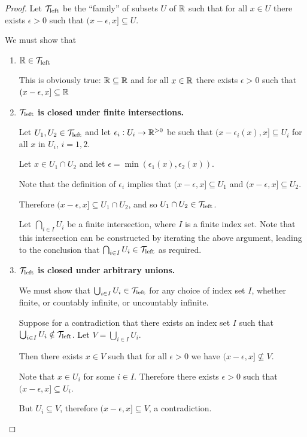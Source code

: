 \documentclass[12pt]{article}
\begin{document}
\begin{proof}
  Let $\mathcal T_\text{left}$ be the ``family'' of subsets $U$ of $\mathbb{R}$ such that for all $x \in U$ there exists
  $\epsilon > 0$ such that $(x - \epsilon, x] \subseteq U$.

  We must show that
  \begin{enumerate}
  \item {\bf $\mathbb{R} \in \mathcal T_\text{left}$}

    This is obviously true: $\mathbb{R} \subseteq \mathbb{R}$ and for all $x \in \mathbb{R}$ there exists $\epsilon > 0$
    such that $(x - \epsilon, x] \subseteq \mathbb{R}$



  \item {\bf $\mathcal T_\text{left}$ is closed under finite intersections.}

    Let $U_1, U_2 \in \mathcal T_\text{left}$ and let $\epsilon_i:U_i \to \mathbb{R}^{>0}$ be such that
    $(x - \epsilon_i(x), x] \subseteq U_i$ for all $x$ in $U_i$, $i = 1, 2$.

    Let $x \in U_1 \cap U_2$ and let $\epsilon = \min(\epsilon_1(x), \epsilon_2(x))$.

    Note that the definition of $\epsilon_i$ implies that $(x - \epsilon, x] \subseteq U_1$ and
    $(x - \epsilon, x] \subseteq U_2$.

    Therefore $(x - \epsilon, x] \subseteq U_1 \cap U_2$, and so $U_1 \cap U_2 \in \mathcal T_\text{left}$.

    Let $\bigcap_{i \in I} U_i$ be a finite intersection, where $I$ is a finite index set. Note
    that this intersection can be constructed by iterating the above argument, leading to the
    conclusion that $\bigcap_{i \in I} U_i \in \mathcal T_\text{left}$ as required.

  \item {\bf $\mathcal T_\text{left}$ is closed under arbitrary unions.}

    We must show that $\bigcup_{i \in I} U_i \in \mathcal T_\text{left}$ for any choice of index set $I$, whether
    finite, or countably infinite, or uncountably infinite.

    Suppose for a contradiction that there exists an index set $I$ such that
    $\bigcup_{i \in I} U_i \notin \mathcal T_\text{left}$. Let $V = \bigcup_{i \in I} U_i$.

    Then there exists $x \in V$ such that for all $\epsilon > 0$ we have
    $(x - \epsilon, x] \not\subseteq V$.

    Note that $x \in U_i$ for some $i \in I$. Therefore there exists $\epsilon > 0$ such that
    $(x - \epsilon, x] \subseteq U_i$.

    But $U_i \subseteq V$, therefore $(x - \epsilon, x] \subseteq V$, a contradiction.
  \end{enumerate}
\end{proof}
\end{document}
